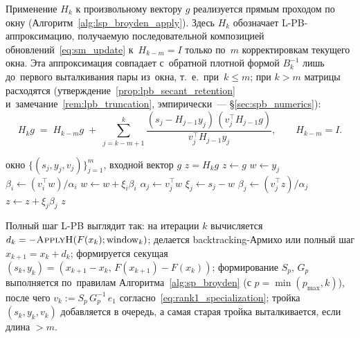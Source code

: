 Применение $H_k$ к произвольному вектору $g$ реализуется прямым
проходом по окну (Алгоритм~\ref{alg:lsp_broyden_apply}). Здесь $H_k$
обозначает L-PB-аппроксимацию, получаемую последовательной композицией
обновлений~\eqref{eq:sm_update} к~$H_{k-m}=I$ только по~$m$
корректировкам текущего окна. Эта аппроксимация совпадает с~обратной
плотной формой $B_k^{-1}$ лишь до~первого выталкивания пары из~окна,
т.~е.\ при~$k\le m$; при $k>m$ матрицы расходятся
(утверждение~\ref{prop:lpb_secant_retention}
и~замечание~\ref{rem:lpb_truncation}, эмпирически~--- \S\ref{sec:spb_numerics}):
\begin{equation}\label{eq:lsp_recursion}
  H_k g \;=\; H_{k-m} g \;+\; \sum_{j=k-m+1}^{k}
     \frac{(s_j - H_{j-1} y_j)\,(v_j^{\top} H_{j-1} g)}
          {v_j^{\top} H_{j-1} y_j},\qquad H_{k-m}=I.
\end{equation}

\begin{algorithm}[H]
\caption{Применение $H_k\,g$ для L-PB (прямой проход по окну)}
\label{alg:lsp_broyden_apply}
\begin{algorithmic}[1]
   \Require окно $\{(s_j, y_j, v_j)\}_{j=1}^{m}$, входной вектор $g$
   \Ensure $z = H_k g$
   \State $z \leftarrow g$ 
      \State $w \leftarrow y_j$ 
         \State $\beta_i \leftarrow (v_i^{\top} w)/\alpha_i$
         \State $w \leftarrow w + \xi_i \beta_i$
      \EndFor
      \State $\alpha_j \leftarrow v_j^{\top} w$
      \State $\xi_j \leftarrow s_j - w$
      \State $\beta_j \leftarrow (v_j^{\top} z)/\alpha_j$
      \State $z \leftarrow z + \xi_j \beta_j$
   \EndFor
   \State \Return $z$
\end{algorithmic}
\end{algorithm}

Полный шаг L-PB выглядит так: на итерации $k$ вычисляется
$d_k = -\Call{ApplyH}{F(x_k); \mathrm{window}_k}$; делается
backtracking-Армихо или полный шаг
$x_{k+1}=x_k+d_k$; формируется секущая
$(s_k, y_k) = (x_{k+1}-x_k,\, F(x_{k+1})-F(x_k))$;
формирование $S_p,\,G_p$ выполняется по~правилам
Алгоритма~\ref{alg:sp_broyden} (с $p = \min(p_{\max}, k)$), после чего
$v_k := S_p\,G_p^{-1}\,e_1$ согласно~\eqref{eq:rank1_specialization};
тройка $(s_k,y_k,v_k)$ добавляется в очередь, а самая старая тройка
выталкивается, если длина $> m$.

